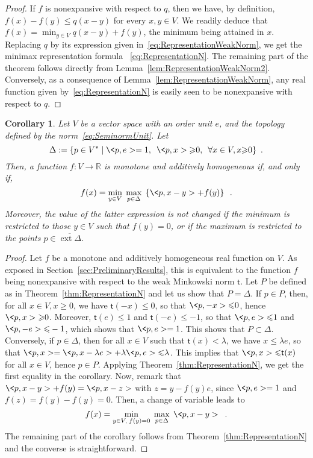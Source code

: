 \documentclass[a4paper,11pt]{amsart}
\newtheorem{corollary}[theorem]{Corollary}
\theoremstyle{definition}
\theoremstyle{remark}
\begin{document}
\begin{proof}
  If $f$ is nonexpansive with respect to $q$, then we have, by definition, $f(x)-f(y) {\leqslant} q(x-y)$ for every $x,y \in V$.
  We readily deduce that $f(x) = \min_{y \in V} q(x-y)+f(y)$, the minimum being attained in $x$.
  Replacing $q$ by its expression given in~\eqref{eq:RepresentationWeakNorm}, we get the minimax representation formula ~\eqref{eq:RepresentationN}.
  The remaining part of the theorem follows directly from Lemma~\ref{lem:RepresentationWeakNorm2}.
  Conversely, as a consequence of Lemma~\ref{lem:RepresentationWeakNorm}, any real function given by~\eqref{eq:RepresentationN} is easily seen to be nonexpansive with respect to $q$.
\end{proof}

\begin{corollary}
  \label{coro:RepresentationMAH}
  Let $V$ be a vector space with an order unit ${e}$, and the topology defined by the norm~\eqref{eq:SeminormUnit}.
  Let
  \[
    \Delta := \{ p \in V^* \mid \<p,{e}> = 1, \enspace \<p,x> {\geqslant} 0, \enspace \forall x \in V, x {\geqslant} 0 \}
    \enspace .
  \]
  Then, a function $f:V \to {\mathbb{R}}$ is monotone and additively homogeneous if, and only if, 
  \[
    f(x) = \min_{y \in V} \; \max_{p \in \Delta} \; \left\{ \<p,x-y> + f(y) \right\} \enspace .
  \]
  Moreover, the value of the latter expression is not changed if the minimum is restricted to those $y \in V$ such that $f(y)=0$, or if the maximum is restricted to the points $p \in {\overline{{\operatorname{ext}{\Delta}}}}$.
\end{corollary}

\begin{proof}
  Let $f$ be a monotone and additively homogeneous real function on $V$.
  As exposed in Section~\ref{sec:PreliminaryResults}, this is equivalent to the function $f$ being nonexpansive with respect to the weak Minkowski norm ${\mathsf{t}}$.
  Let $P$ be defined as in Theorem~\ref{thm:RepresentationN} and let us show that $P=\Delta$.
  If $p \in P$, then, for all $x \in V, x {\geqslant} 0$, we have ${\mathsf{t}}(-x) {\leqslant} 0$, so that $\<p,-x> {\leqslant} 0$, hence $\<p,x> {\geqslant} 0$.
  Moreover, ${\mathsf{t}}({e}) {\leqslant} 1$ and ${\mathsf{t}}(-{e}) {\leqslant} -1$, so that $\<p,{e}> {\leqslant} 1$ and $\<p,-{e}> {\leqslant} -1$, which shows that $\<p,{e}>=1$.
  This shows that $P\subset \Delta$.
  Conversely, if $p \in \Delta$, then for all $x \in V$ such that ${\mathsf{t}}(x) < \lambda$, we have $x {\leqslant} \lambda {e}$, so that $\<p,x> = \<p,x-\lambda {e}> + \lambda \<p,{e}> {\leqslant} \lambda$.
  This implies that $\<p,x> {\leqslant} {\mathsf{t}}(x)$ for all $x \in V$, hence $p \in P$.
  Applying  Theorem~\ref{thm:RepresentationN}, we get the first equality in the corollary.
  Now, remark  that $\<p,x-y> + f(y) = \<p,x-z>$ with $z = y-f(y){e}$, since $\<p,{e}>=1$ and $f(z)=f(y)-f(y)=0$.
  Then, a change of variable leads to
  \[
    f(x)= \min_{y \in V, \; f(y)=0} \; \max_{p \in \Delta} \; \<p,x-y> \enspace .
  \]
  The remaining part of the corollary follows from Theorem~\ref{thm:RepresentationN} and the converse is straightforward.
\end{proof}
\end{document}
